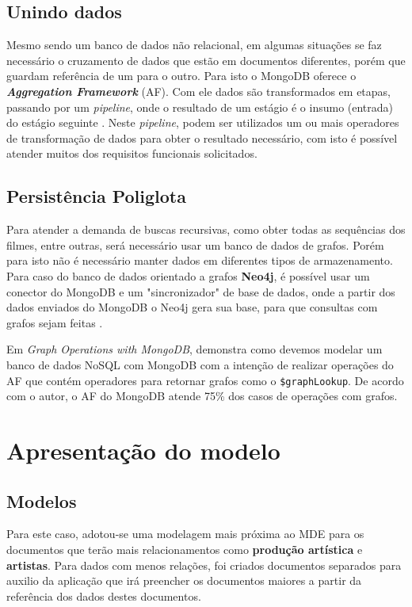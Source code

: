 \documentclass[
	12pt,				%
	openright,			%
	oneside,			%
	a4paper,			%
	english,			%
	french,				%
	spanish,			%
	brazil,				%
	]{abntex2}
\begin{document}
\section{Unindo dados}
Mesmo sendo um banco de dados não relacional, em algumas situações se faz necessário o cruzamento de dados que estão em documentos diferentes, porém que guardam referência de um para o outro. Para isto o MongoDB oferece o \textbf{\textit{Aggregation Framework}} (AF). Com ele dados são transformados em etapas, passando por um \textit{pipeline}, onde o resultado de um estágio é o insumo (entrada) do estágio seguinte \cite{views-materializadas}. Neste \textit{pipeline}, podem ser utilizados um ou mais operadores de transformação de dados para obter o resultado necessário, com isto é possível atender muitos dos requisitos funcionais solicitados.

\section{Persistência Poliglota}
Para atender a demanda de buscas recursivas, como obter todas as sequências dos filmes, entre outras, será necessário usar um banco de dados de grafos. Porém para isto não é necessário manter dados em diferentes tipos de armazenamento. Para caso do banco de dados orientado a grafos \textbf{Neo4j}, é possível usar um conector do MongoDB e um "sincronizador" de base de dados, onde a partir dos dados enviados do MongoDB o Neo4j gera sua base, para que consultas com grafos sejam feitas \cite{neo4jMongo}.

Em \textit{Graph Operations with MongoDB}, \cite{graphoperator} demonstra como devemos modelar um banco de dados NoSQL com MongoDB com a intenção de realizar operações do AF que contém operadores para retornar grafos como o \verb+$graphLookup+. De acordo com o autor, o AF do MongoDB atende 75\% dos casos de operações com grafos.

\chapter{Apresentação do modelo}

\section[Modelos]{Modelos}

Para este caso, adotou-se uma modelagem mais próxima ao MDE para os documentos que terão mais relacionamentos como \textbf{produção artística} e \textbf{artistas}. Para dados com menos relações, foi criados documentos separados para auxilio da aplicação que irá preencher os documentos maiores a partir da referência dos dados destes documentos.
\end{document}
